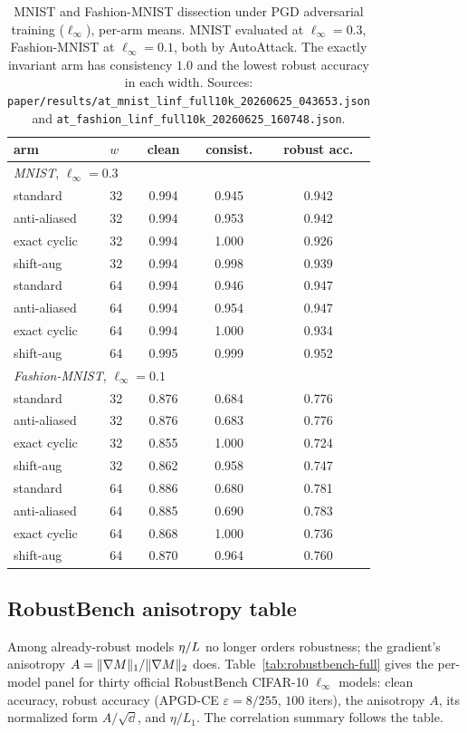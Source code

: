 \begin{table}[t]\centering
\caption{MNIST and Fashion-MNIST dissection under PGD adversarial training
($\ell_\infty$), per-arm means. MNIST evaluated at $\ell_\infty{=}0.3$,
Fashion-MNIST at $\ell_\infty{=}0.1$, both by AutoAttack. The exactly invariant
arm has consistency $1.0$ and the lowest robust accuracy in each width. Sources:
\texttt{paper/results/at\_mnist\_linf\_full10k\_20260625\_043653.json} and
\texttt{at\_fashion\_linf\_full10k\_20260625\_160748.json}.}
\label{tab:at-mf-full}
\footnotesize
\begin{tabular}{ll ccc}
\toprule
arm & $w$ & clean & consist. & robust acc. \\
\midrule
\multicolumn{5}{l}{\emph{MNIST}, $\ell_\infty{=}0.3$}\\
standard     & 32 & 0.994 & 0.945 & 0.942 \\
anti-aliased & 32 & 0.994 & 0.953 & 0.942 \\
exact cyclic & 32 & 0.994 & 1.000 & 0.926 \\
shift-aug    & 32 & 0.994 & 0.998 & 0.939 \\
standard     & 64 & 0.994 & 0.946 & 0.947 \\
anti-aliased & 64 & 0.994 & 0.954 & 0.947 \\
exact cyclic & 64 & 0.994 & 1.000 & 0.934 \\
shift-aug    & 64 & 0.995 & 0.999 & 0.952 \\
\midrule
\multicolumn{5}{l}{\emph{Fashion-MNIST}, $\ell_\infty{=}0.1$}\\
standard     & 32 & 0.876 & 0.684 & 0.776 \\
anti-aliased & 32 & 0.876 & 0.683 & 0.776 \\
exact cyclic & 32 & 0.855 & 1.000 & 0.724 \\
shift-aug    & 32 & 0.862 & 0.958 & 0.747 \\
standard     & 64 & 0.886 & 0.680 & 0.781 \\
anti-aliased & 64 & 0.885 & 0.690 & 0.783 \\
exact cyclic & 64 & 0.868 & 1.000 & 0.736 \\
shift-aug    & 64 & 0.870 & 0.964 & 0.760 \\
\bottomrule
\end{tabular}
\end{table}

\subsection{RobustBench anisotropy table}\label{app:robustbench-full}
Among already-robust models $\eta/L$ no longer orders robustness; the gradient's
anisotropy $A=\lVert\nabla M\rVert_1/\lVert\nabla M\rVert_2$ does.
Table~\ref{tab:robustbench-full} gives the per-model panel for thirty official
RobustBench CIFAR-10 $\ell_\infty$ models: clean accuracy, robust accuracy
(APGD-CE $\varepsilon{=}8/255$, $100$ iters), the anisotropy $A$, its normalized
form $A/\sqrt\dd$, and $\eta/L_1$. The correlation summary follows the table.

